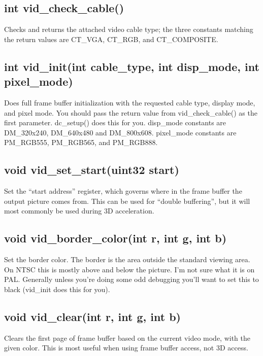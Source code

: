 \documentclass[english]{report}
\begin{document}
\subsection{int vid\_check\_cable()}

Checks and returns the attached video cable type; the three constants
matching the return values are CT\_VGA, CT\_RGB, and CT\_COMPOSITE.


\subsection{int vid\_init(int cable\_type, int disp\_mode, int pixel\_mode)}

Does full frame buffer initialization with the requested cable type,
display mode, and pixel mode. You should pass the return value from
vid\_check\_cable() as the first parameter. dc\_setup() does this
for you. disp\_mode constants are DM\_320x240, DM\_640x480 and DM\_800x608.
pixel\_mode constants are PM\_RGB555, PM\_RGB565, and PM\_RGB888.


\subsection{void vid\_set\_start(uint32 start)}

Set the ``start address'' register, which governs where in the
frame buffer the output picture comes from. This can be used for ``double
buffering'', but it will most commonly be used during 3D acceleration.


\subsection{void vid\_border\_color(int r, int g, int b)}

Set the border color. The border is the area outside the standard
viewing area. On NTSC this is mostly above and below the picture.
I'm not sure what it is on PAL. Generally unless you're doing some
odd debugging you'll want to set this to black (vid\_init does this
for you).


\subsection{void vid\_clear(int r, int g, int b)}

Clears the first page of frame buffer based on the current video mode,
with the given color. This is most useful when using frame buffer
access, not 3D access.
\end{document}
